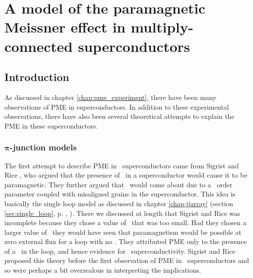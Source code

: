 %


\chapter{A model of the paramagnetic Meissner effect 
in multiply-connected superconductors}
\label{chap:pme_theory}

\section{Introduction}

As discussed in  chapter \ref{chap:pme_experiment}, there have 
been many observations of PME in superconductors. 
In addition to these experimental observations, there 
have also been several theoretical attempts to explain 
the PME in these superconductors. 

\subsection[\pijunction\ models]{$\mathbf{\pi}$-junction models}

The first attempt to describe PME in \hightc\ superconductors came from
Sigrist and Rice \cite{sigrist_jpsj_61_4283_1992,%
sigrist_rmp_503_67_1995}, who argued that the presence 
of \pijunctions\ in a superconductor would cause it to be
paramagnetic. They further argued that \pijunctions\ would
come about due to a \dwave\ order parameter coupled with
misaligned grains in the superconductor. This idea is basically
the single loop model as discussed in chapter \ref{chap:jjarray}
(section \ref{sec:single_loop}, p. \pageref{sec:single_loop}, 
).
There we discussed at length that Sigrist and Rice was incomplete because they
 chose a value of 
\betal\ that was too small. Had they chosen a larger value
of \betal\ they would have seen that paramagnetism would be 
possible at zero external flux for a loop with no \pijunctions.
They attributed PME only  
to the presence of a \pijunction\ in the loop,
and hence evidence for \dwave\ superconductivity. 
Sigrist and Rice proposed this theory before the first
observation of PME in \lowtc\ superconductors
\cite{thompson_prl_75_529_1995}
and so were perhaps a bit overzealous in interpreting the implications.

